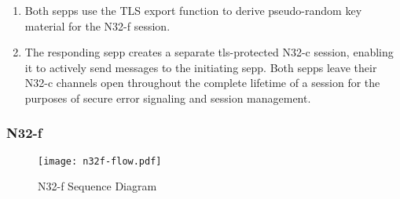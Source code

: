 \begin{enumerate}[wide, labelwidth=!, labelindent=0pt]
    \item Both \glspl{sepp} use the TLS export function to derive pseudo-random key material for the N32-f session.
    \item The responding \gls{sepp} creates a separate \gls{tls}-protected N32-c session, enabling it to actively send messages to the initiating \gls{sepp}. Both \glspl{sepp} leave their N32-c channels open throughout the complete lifetime of a session for the purposes of secure error signaling and session management.
\end{enumerate}

\subsubsection{N32-f}

\begin{figure}[h!]
    \centering
    \texttt{[image: n32f-flow.pdf]}
    \caption{N32-f Sequence Diagram}
    \label{fig:n32f-sequence}
\end{figure}

